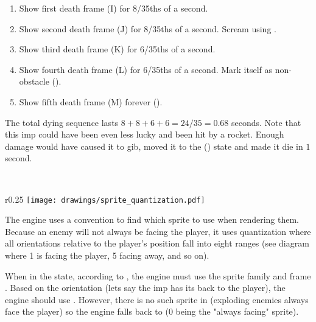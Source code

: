 \begin{enumerate}
\item Show first death frame (I) for 8/35ths of a second.
\item Show second death frame (J) for 8/35ths of a second. Scream using .
\item Show third death frame (K) for 6/35ths of a second.
\item Show fourth death frame (L) for 6/35ths of a second. Mark itself as non-obstacle ().
\item Show fifth death frame (M) forever ().
\end{enumerate}
\par
The total dying sequence lasts $8+8+6+6=24/35 = 0.68$ seconds. Note that this imp could have been even less lucky and been hit by a rocket. Enough damage would have caused it to gib, moved it to the  () state and made it die in $1$ second.\\
\par
{}\\
\par
{}




\par
\begin{wrapfigure}[9]{r}{0.25\textwidth}
\centering
\texttt{[image: drawings/sprite\_quantization.pdf]}
\end{wrapfigure}
The engine uses a convention to find which sprite to use when rendering them. Because an enemy will not always be facing the player, it uses quantization where all orientations relative to the player's position fall into eight ranges (see diagram where 1 is facing the player, 5 facing away, and so on).\\
\par
When in the  state, according to , the engine must use the sprite family  and frame . Based on the orientation (lets say the imp has its back to the player), the engine should use . However, there is no such sprite in  (exploding enemies always face the player) so the engine falls back to  (0 being the "always facing" sprite).
\par







